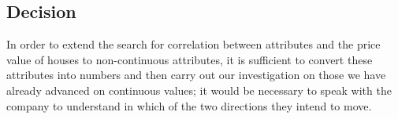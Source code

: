 \subsection{Decision}

In order to extend the search for correlation between attributes and the price value of houses to non-continuous attributes, it is sufficient to convert these attributes into numbers and then carry out our investigation on those we have already advanced on continuous values; it would be necessary to speak with the company to understand in which of the two directions they intend to move.
